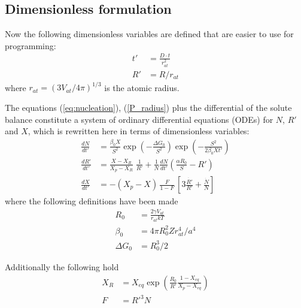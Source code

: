 \documentclass[12pt,a4paper]{article}
\begin{document}
\subsection{Dimensionless formulation}
Now the following dimensionless variables are defined that are easier to use for programming:
\begin{subequations}
	\label{dmls}
	\begin{align}
t' &= \frac{D\cdot t}{r_{at}^2} \\
R' &= R / r_{at}
	\end{align}
\end{subequations}
where $r_{at} = (3V_{at}/4\pi)^{1/3}$ is the atomic radius.

The equations (\ref{eq:nucleation}), (\ref{P_radius}) plus the differential of the solute balance constitute a system of ordinary differential equations (ODEs) for $N$, $R'$ and $X$, which is rewritten here in terms of dimensionless variables:
\begin{subequations}
\label{eq:ngode}
\begin{align}
\frac{dN}{dt'} &= 
\frac{\beta_0 X}{S^2} 
\exp\left( -\frac{\Delta G_0}{S^2}\right)  
\exp\left( -\frac{S^2}{2\beta_0 X t'}\right)  \\
\frac{dR'}{dt'} &=  
\frac{X - X_R}{X_p - X_R} 
\; \frac{1}{R'}
+ 
\frac{1}{N}\frac{dN}{dt'}
\left( \frac{\alpha R_0}{S} - R' \right) \\
\frac{dX}{dt'} &= -(X_p - X)\, \frac{F}{1-F} \,
\left[ 3\frac{\dot{R'}}{R'} + \frac{\dot{N}}{N} \right]
\end{align}
\end{subequations}
where the following definitions have been made
\begin{subequations}
\begin{align}
R_0 &= \frac{2\gamma V_{at}}{r_{at}kT} \\ 
\beta_0 &= 4\pi R_0^2 Z r_{at}^4/ a^4 \\
\Delta G_0 &= R_0^3/2  
\end{align}
\end{subequations}

Additionally the following hold
\begin{subequations}
\begin{align}
X_R &= X_{eq} \exp 
\left( \frac{R_0}{R'} \frac{1-X_{eq}}{X_p - X_{eq}}\right) \\
F &= R'^3 N
\end{align}
\end{subequations}
\end{document}
